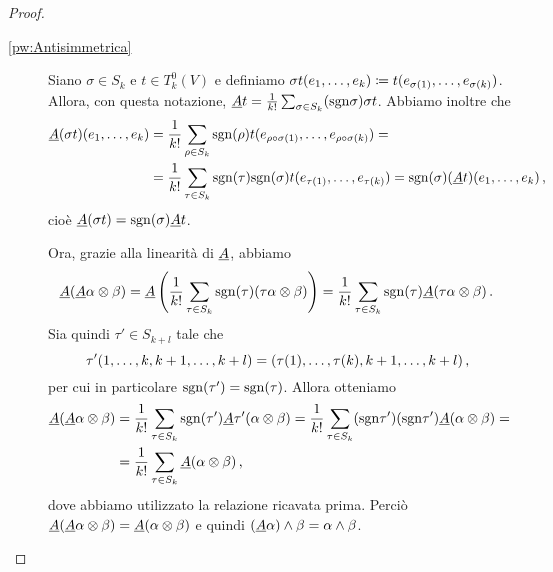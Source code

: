 \begin{proof}
\begin{description}
 \item [\ref{pw:Antisimmetrica}]
	Siano $\sigma \in S_k$ e $t\in T^0_k(V)$ e definiamo $\sigma t(\seqb{e}{k}{,}) \coloneqq t(e_{\sigma(1)}, \ldots, e_{\sigma(k)})$. Allora, con questa notazione, $\antisimm t =\frac 1{k!} \sum_{\sigma\in S_k} (\sgn\sigma) \sigma t$.
	Abbiamo inoltre che 
	\begin{align*}
		\antisimm (\sigma t)(\seqb ek,) &= \frac 1{k!} \sum_{\rho \in S_k} \sgn (\rho) t(e_{\rho\circ\sigma (1)},\ldots,e_{\rho\circ\sigma(k)}) =\\
		&= \frac 1{k!} \sum_{\tau\in S_k} \sgn(\tau)\sgn(\sigma) t(e_{\tau(1)}, \ldots, e_{\tau(k)}) = \sgn(\sigma) (\antisimm t)(\seqb{e}{k}{,})\virgola
	\end{align*}
	cioè $\antisimm (\sigma t) = \sgn (\sigma) \antisimm t$.%

	Ora, grazie alla linearità di $\antisimm$, abbiamo
	\begin{equation*}
		\antisimm(\antisimm \alpha \otimes \beta) = \antisimm\left(\frac 1{k!} \sum_{\tau\in S_k} \sgn(\tau) (\tau\alpha \otimes \beta)\right) =
		\frac 1{k!} \sum_{\tau\in S_k}\sgn(\tau) \antisimm(\tau\alpha\otimes \beta)\punto
	\end{equation*}
	Sia quindi $\tau'\in S_{k+l}$ tale che
	\begin{equation*}
		\tau'(1,\ldots,k,k+1,\ldots,k+l) = (\tau(1),\ldots,\tau(k),k+1,\ldots,k+l) \virgola
	\end{equation*}
	per cui in particolare $\sgn(\tau')=\sgn(\tau)$.
	Allora otteniamo 
	\begin{align*}
		\antisimm(\antisimm \alpha \otimes \beta) &= \frac 1{k!} \sum_{\tau\in S_k} \sgn(\tau')\antisimm\tau'(\alpha\otimes \beta)= \frac 1{k!} \sum_{\tau\in S_k} (\sgn\tau')(\sgn\tau')\antisimm(\alpha\otimes \beta)=\\
		&=\frac 1{k!} \sum_{\tau\in S_k} \antisimm(\alpha\otimes \beta)\virgola
	\end{align*}
	dove abbiamo utilizzato la relazione ricavata prima.
	Perciò $\antisimm(\antisimm\alpha\otimes \beta) = \antisimm(\alpha\otimes\beta)$ e quindi $(\antisimm\alpha)\wedge\beta = \alpha\wedge\beta$.
	

\end{description}
\end{proof}
